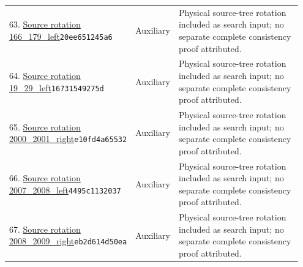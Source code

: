 \begin{longtable}{@{}p{0.27\linewidth}p{0.13\linewidth}p{0.55\linewidth}@{}}
63. \href{https://github.com/VladimirReshetnikov/ProveIt/blob/32d0d8b7d93a63ad4106c18cdb29b37927acdad2/Computability/BusyBeaver/Research/PA/docs/pa_consistency_research_2026-11-14_2/research/physical/inputs/rotations/166_179_left.tm}{Source rotation 166\_\allowbreak{}179\_\allowbreak{}left}\newline\texttt{20ee651245a6} & Auxiliary & Physical source-tree rotation included as search input; no separate complete consistency proof attributed.\\[5pt]
64. \href{https://github.com/VladimirReshetnikov/ProveIt/blob/32d0d8b7d93a63ad4106c18cdb29b37927acdad2/Computability/BusyBeaver/Research/PA/docs/pa_consistency_research_2026-11-14_2/research/physical/inputs/rotations/19_29_left.tm}{Source rotation 19\_\allowbreak{}29\_\allowbreak{}left}\newline\texttt{16731549275d} & Auxiliary & Physical source-tree rotation included as search input; no separate complete consistency proof attributed.\\[5pt]
65. \href{https://github.com/VladimirReshetnikov/ProveIt/blob/32d0d8b7d93a63ad4106c18cdb29b37927acdad2/Computability/BusyBeaver/Research/PA/docs/pa_consistency_research_2026-11-14_2/research/physical/inputs/rotations/2000_2001_right.tm}{Source rotation 2000\_\allowbreak{}2001\_\allowbreak{}right}\newline\texttt{e10fd4a65532} & Auxiliary & Physical source-tree rotation included as search input; no separate complete consistency proof attributed.\\[5pt]
66. \href{https://github.com/VladimirReshetnikov/ProveIt/blob/32d0d8b7d93a63ad4106c18cdb29b37927acdad2/Computability/BusyBeaver/Research/PA/docs/pa_consistency_research_2026-11-14_2/research/physical/inputs/rotations/2007_2008_left.tm}{Source rotation 2007\_\allowbreak{}2008\_\allowbreak{}left}\newline\texttt{4495c1132037} & Auxiliary & Physical source-tree rotation included as search input; no separate complete consistency proof attributed.\\[5pt]
67. \href{https://github.com/VladimirReshetnikov/ProveIt/blob/32d0d8b7d93a63ad4106c18cdb29b37927acdad2/Computability/BusyBeaver/Research/PA/docs/pa_consistency_research_2026-11-14_2/research/physical/inputs/source_programs/2008_2009_right/machine.native.tm}{Source rotation 2008\_\allowbreak{}2009\_\allowbreak{}right}\newline\texttt{eb2d614d50ea} & Auxiliary & Physical source-tree rotation included as search input; no separate complete consistency proof attributed.\\[5pt]

\end{longtable}
